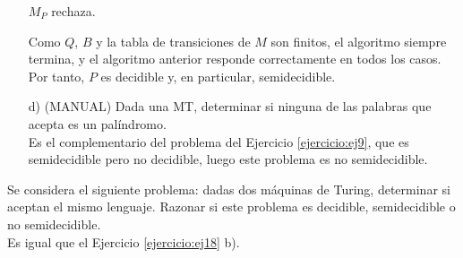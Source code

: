 \begin{ejercicio}
\begin{itemize}
\begin{algorithm}
\begin{algorithmic}
                \State $M_{P}$ rechaza.
            \end{algorithmic}
        \end{algorithm}

        Como $Q$, $B$ y la tabla de transiciones de $M$ son finitos, el algoritmo siempre termina, y el algoritmo 
        anterior responde correctamente en todos los casos. Por tanto, $P$ es decidible y, en particular, semidecidible.

        \item[d)] (MANUAL) Dada una MT, determinar si ninguna de las palabras que acepta es un palíndromo. \\
        
        Es el complementario del problema del Ejercicio \ref{ejercicio:ej9}, que es semidecidible pero no decidible, luego este problema
        es no semidecidible.

    \end{itemize}
\end{ejercicio}




\begin{ejercicio}
    Se considera el siguiente problema: dadas dos máquinas de Turing, determinar si aceptan el mismo lenguaje. 
    Razonar si este problema es decidible, semidecidible o no semidecidible. \\

    Es igual que el Ejercicio \ref{ejercicio:ej18} b).
\end{ejercicio}




